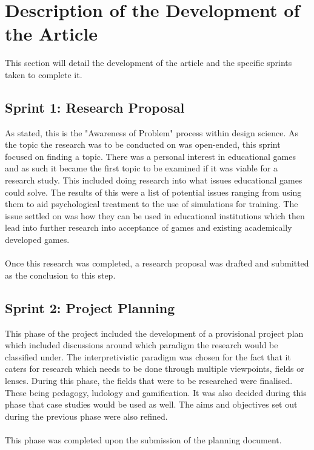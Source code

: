 \section{Description of the Development of the Article}
This section will detail the development of the article and the specific sprints taken to complete it. 

\subsection{Sprint 1: Research Proposal}
As stated, this is the "Awareness of Problem" process within design science. As the topic the research was to be conducted on was open-ended, this sprint focused on finding a topic. There was a personal interest in educational games and as such it became the first topic to be examined if it was viable for a research study. This included doing research into what issues educational games could solve. The results of this were a list of potential issues ranging from using them to aid psychological treatment to the use of simulations for training. The issue settled on was how they can be used in educational institutions which then lead into further research into acceptance of games and existing academically developed games. 
\\\\
Once this research was completed, a research proposal was drafted and submitted as the conclusion to this step.

\subsection{Sprint 2: Project Planning}
This phase of the project included the development of a provisional project plan which included discussions around which paradigm the research would be classified under. The interpretivistic paradigm was chosen for the fact that it caters for research which needs to be done through multiple viewpoints, fields or lenses. During this phase, the fields that were to be researched were finalised. These being pedagogy, ludology and gamification. It was also decided during this phase that case studies would be used as well. The aims and objectives set out during the previous phase were also refined.
\\\\
This phase was completed upon the submission of the planning document.

